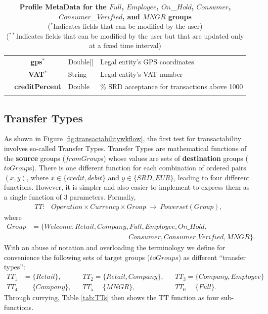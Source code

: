 \begin{table}[H]
\begin{centering}
{\begin{tabular}{ r | c | l | l }
			& {\bf gps}$^*$				&Double[]	& Legal entity's GPS coordinates \\
			& {\bf VAT}$^*$				&String	& Legal entity's VAT number \\
			& {\bf creditPercent}			&Double	& \% SRD acceptance for transactions above 1000 \\
\Xhline{1.5pt}
\end{tabular}
}
\caption{\small\textbf{Profile MetaData for the $Full$, $Employee$, $On$\_$Hold$, $Consumer$, $Consumer$\_$Verified$, and $MNGR$ groups}\\
($^*$Indicates fields that can be modified by the user)\\
($^{**}$Indicates fields that can be modified by the user but that are updated only at a fixed time interval)
}
\label{tab:ProfileMetaData2}
\end{centering}
\vspace{-1.0cm}
\end{table}

\subsection{Transfer Types}
\label{subsec:perm-trans-types}
As shown in Figure \ref{fig:transactabilitywkflow}, the first test for transactability involves so-called Transfer Types. Transfer Types are mathematical functions of the {\bf source} groups ($fromGroup$s) whose values are sets of {\bf destination} groups ($toGroup$s). There is one different function for each combination of ordered pairs $(x, y)$, where $x \in \{ credit, debit \}$ and $y \in \{ SRD, EUR \}$, leading to four different functions. However, it is simpler and also easier to implement to express them as a single function of 3 parameters. Formally,
\begin{align}
TT\colon &Operation \times Currency \times Group\ \rightarrow\ Powerset(Group),
\end{align}
where
\begin{align}
Group &= \{ Welcome, Retail, Company, Full, Employee, On\text{\_}Hold,  \nonumber \\
		& \qquad\qquad\qquad\qquad\qquad\qquad\qquad
			Consumer, Consumer\text{\_}Verified, MNGR \}.
\end{align}
With an abuse of notation and overloading the terminology we define for convenience the following sets of target groups ($toGroups$) as different ``transfer types'':
\begin{align*}
TT_1 &= \{ Retail \},		&& TT_2 = \{ Retail, Company \},	&& TT_3 = \{ Company, Employee \} \\
TT_4 &= \{ Company \},	&& TT_5 = \{ MNGR \},			&& TT_6 = \{ Full \}.
\end{align*}
Through currying, Table \ref{tab:TTs} then shows the TT function as four sub-functions.

